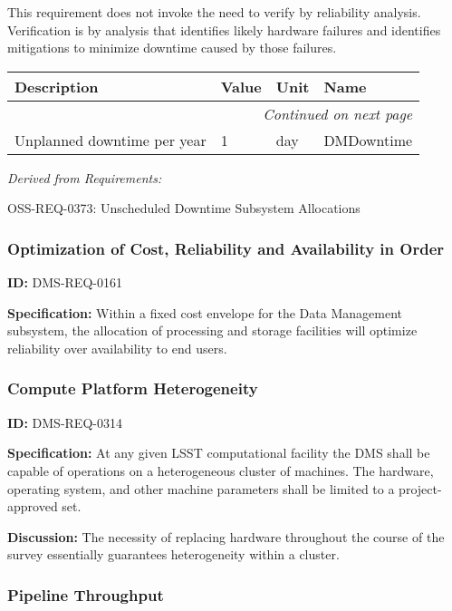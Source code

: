 \documentclass[SE,toc,lsstdraft]{lsstdoc}
\makeatletter
\newcommand{\paramname}[1]{\hspace{0pt}#1}
\newcommand{\unitname}[1]{\hspace{0pt}#1}
\newenvironment{parameters}[0]{%
\setlength\LTleft{0pt}
\setlength\LTright{\fill}
\begin{small}
\begin{longtable}[]{|p{0.5\textwidth}|l|p{0.6in}|p{1.74in}@{}|}

\hline \textbf{Description} & \textbf{Value} & \textbf{Unit} & \textbf{Name} \\ \hline
\endhead

\hline \multicolumn{4}{r}{\emph{Continued on next page}} \\
\endfoot

\hline\hline
\endlastfoot
}{%
\hline
\end{longtable}
\end{small}
}
\makeatother
\begin{document}
This requirement does not invoke the need to verify by reliability analysis. Verification is by analysis that identifies likely hardware failures and identifies mitigations to minimize downtime caused by those failures.



\begin{parameters}
Unplanned downtime per year
&
1
&
\unitname{%
day
}
&
\paramname{%
DMDowntime
} \\\hline
\end{parameters}




\emph{Derived from Requirements:}

OSS-REQ-0373:
Unscheduled Downtime Subsystem Allocations \newline


\subsubsection{Optimization of Cost, Reliability and Availability in Order}

\label{DMS-REQ-0161}
\textbf{ID:} DMS-REQ-0161

\textbf{Specification:} Within a fixed cost envelope for the Data Management subsystem, the allocation of processing and storage facilities will optimize reliability over availability to end users.






\subsubsection{Compute Platform Heterogeneity}

\label{DMS-REQ-0314}
\textbf{ID:} DMS-REQ-0314

\textbf{Specification:} At any given LSST computational facility the DMS shall be capable of operations on a heterogeneous cluster of machines. The hardware, operating system, and other machine parameters shall be limited to a project-approved set.

\textbf{Discussion: }The necessity of replacing hardware throughout the course of the survey essentially guarantees heterogeneity within a cluster.




\subsubsection{Pipeline Throughput}
\end{document}
